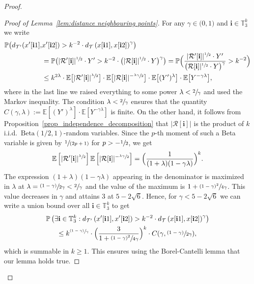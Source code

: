 \documentclass[JEP,XML,SOM,Unicode,NoFloatCountersInSection,published]{cedram}
\newcommand{\psfrac}[2]{\sfrac{(#1)}{#2}}
\newcommand{\spfrac}[2]{\sfrac{#1}{(#2)}}
\newcommand{\Ec}[1]{\mathbb{E} \left[#1\right]}
\newcommand{\bEc}[1]{\mathbb{E} \bigl[#1\bigr]}
\newcommand{\Pp}[1]{\mathbb{P} \left(#1\right)}
\newcommand{\bPp}[1]{\mathbb{P} \bigl(#1\bigr)}
\newcommand{\BPp}[1]{\mathbb{P} \Bigl(#1\Bigr)}
\newcommand{\intervalle}[4]{\mathopen{#1}#2\mathclose{}\mathpunct{},#3\mathclose{#4}}
\newcommand{\intervalleoo}[2]{\intervalle{(}{#1}{#2}{)}}
\newcommand{\Tt}{\mathcal{T}}
\newcommand{\ii}{\mathbf{i}}
\theoremstyle{plain}
\theoremstyle{definition}
\begin{document}
\begin{proof}
\begin{proof}[Proof of Lemma~\ref{lem:distance neighbouring points}]
For any $\gamma \in \intervalleoo{0}{1}$ and $\ii \in \mathbb{T}_3^k$ we write\vspace*{-3pt}
\begin{align*}
\bPp{d_{\Tt'}( x'[\ii1],&x'[\ii2])>k^{-2}\cdot d_{\Tt} \left( x[\ii1],x[\ii2] \right)^\gamma}\\
&= \bPp{|\mathcal{R}'[\ii]|^{\sfrac{1}{2}} \cdot Y' > k^{-2} \cdot \bigl(|\mathcal{R}[\ii]|^{\sfrac{1}{2}} \cdot Y\bigr)^\gamma}=\BPp{\frac{|\mathcal{R}'[\ii]|^{\sfrac{1}{2}} \cdot Y'}{ \left(\mathcal{R}[\ii]|^{\sfrac{1}{2}} \cdot Y\right)^\gamma}> k^{-2}}\\
&\leq k^{2\lambda} \cdot \bEc{|\mathcal{R}'[\ii]|^{\sfrac{\lambda}{2}}} \cdot \bEc{|\mathcal{R}[\ii]|^{-\sfrac{\lambda \gamma }{2}}} \cdot \bEc{(Y')^\lambda} \cdot \bEc{Y^{-\gamma \lambda}},
\end{align*}
where in the last line we raised everything to some power $\lambda<\sfrac{2}{\gamma}$ and used the Markov inequality. The condition $\lambda<\sfrac{2}{\gamma}$ ensures that the quantity $C(\gamma,\lambda):=\Ec{(Y')^\lambda} \cdot \Ec{Y^{-\gamma \lambda}}$ is finite.
On the other hand, it follows from Proposition~\ref{prop_independence_decomposition} that $|\mathcal{R}[\ii]|$ is the product of $k$ i.i.d.\ $\mathrm{Beta}(1/2,1)$-random variables.
Since the $p$-th moment of such a Beta variable is given by $\spfrac{1}{2p+1}$ for $p>-\sfrac{1}{2}$, we get\vspace*{-3pt}
\[
\Ec{|\mathcal{R}'[\ii]|^{\sfrac{\lambda}{2}}}\Ec{|\mathcal{R}[\ii]|^{-\sfrac{\lambda \gamma }{2}}} =\Bigl( \frac{1}{(1+\lambda)(1-\gamma \lambda)}\Bigr)^k.
\]
The expression $(1+\lambda)(1-\gamma \lambda)$ appearing in the denominator is maximized in $\lambda$ at $\lambda = \psfrac{1-\gamma}{2\gamma}<\sfrac{2}{\gamma}$ and the value of the maximum is $1+\sfrac{(1-\gamma)^2}{4\gamma}$.
This value decreases in $\gamma$ and attains $3$ at $5- 2\sqrt{6}$.
Hence, for $\gamma < 5-2\sqrt{6}$ we can write a union bound over all $\ii \in \mathbb{T}_3^k$ to get
\begin{multline*}
\Pp{ \exists \ii \in \mathbb{T}_3^k : d_{\Tt'} \left( x'[\ii1],x'[\ii2] \right)>k^{-2}\cdot d_{\Tt} \left( x[\ii1],x[\ii2]\right)^\gamma} \\ \leq k^{\psfrac{1-\gamma}{\gamma}} \cdot\Bigl(\frac{3}{1+\sfrac{(1-\gamma)^2}{4\gamma}} \Bigr)^k \cdot C(\gamma,\psfrac{1-\gamma}{2\gamma}),
\end{multline*}
which is summable in $k\geq 1$. This ensures using the Borel-Cantelli lemma that our lemma holds true.
\end{proof}


\end{proof}
\end{document}
